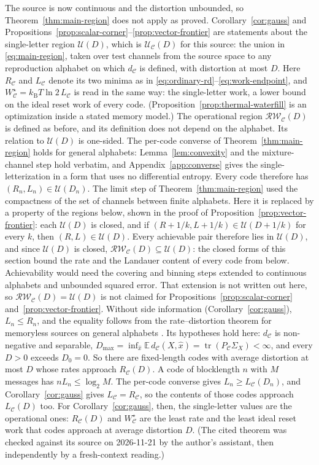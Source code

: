 \documentclass[letterpaper,onecolumn]{IEEEtran}
\theoremstyle{definition}
\theoremstyle{remark}
\newcommand{\E}{\mathbb{E}}
\newcommand{\cC}{\mathcal{C}}
\newcommand{\RW}{\mathcal{R}\!\mathcal{W}}
\newcommand{\PC}{P_{\mathcal{C}}}
\newcommand{\tr}{\operatorname{tr}}
\newcommand{\1}{\mathbf{1}}
\newcommand{\kb}{k_{\mathrm B}}
\begin{document}
The source is now continuous and the distortion unbounded, so
Theorem~\ref{thm:main-region} does not apply as proved.
Corollary~\ref{cor:gauss} and
Propositions~\ref{prop:scalar-corner}--\ref{prop:vector-frontier} are
statements about the single-letter region $\mathcal U(D)$, which is
$\mathcal U_{\cC}(D)$ for this source: the union in \eqref{eq:main-region},
taken over test channels from the source space to any reproduction alphabet on
which $d_{\cC}$ is defined, with distortion at most $D$. Here $R_{\cC}$ and
$L_{\cC}$ denote its two minima as in
\eqref{eq:ordinary-rd}--\eqref{eq:work-endpoint}, and
$W_{\cC}^\star=\kb T\ln2\,L_{\cC}$ is read in the same way: the single-letter
work, a lower bound on the ideal reset work of every code.
(Proposition~\ref{prop:thermal-waterfill} is an optimization inside a stated
memory model.) The operational region $\RW_{\cC}(D)$ is defined as before, and
its definition does not depend on the alphabet. Its relation to
$\mathcal U(D)$ is one-sided. The per-code converse of
Theorem~\ref{thm:main-region} holds for general alphabets:
Lemma~\ref{lem:convexity} and the mixture-channel step hold verbatim, and
Appendix~\ref{app:converse} gives the single-letterization in a form that uses
no differential entropy. Every code therefore has
$(R_n,L_n)\in\mathcal U(D_n)$. The limit step of
Theorem~\ref{thm:main-region} used the compactness of the set of channels
between finite alphabets. Here it is replaced by a property of the regions
below, shown in the proof of Proposition~\ref{prop:vector-frontier}: each
$\mathcal U(D)$ is closed, and if $(R+1/k,L+1/k)\in\mathcal U(D+1/k)$ for every
$k$, then $(R,L)\in\mathcal U(D)$. Every achievable pair therefore lies in
$\mathcal U(D)$, and since $\mathcal U(D)$ is closed,
$\RW_{\cC}(D)\subseteq\mathcal U(D)$: the closed forms of this section bound
the rate and the Landauer content of every code from below. Achievability would need the
covering and binning steps extended to continuous alphabets and unbounded
squared error. That extension is not written out here, so
$\RW_{\cC}(D)=\mathcal U(D)$ is not claimed for
Propositions~\ref{prop:scalar-corner} and~\ref{prop:vector-frontier}. Without
side information (Corollary~\ref{cor:gauss}), $L_n\le R_n$, and the equality
follows from the rate--distortion theorem for memoryless sources on general
alphabets \cite[Thm.~24.2]{polyanskiywu2016}. Its hypotheses hold here:
$d_{\cC}$ is non-negative and separable,
$D_{\max}=\inf_{\hat x}\E\,d_{\cC}(X,\hat x)=\tr(\PC\Sigma_X)<\infty$, and
every $D>0$ exceeds $D_0=0$. So there are fixed-length codes with average
distortion at most $D$ whose rates approach $R_{\cC}(D)$. A code of
blocklength $n$ with $M$ messages has $nL_n\le\log_2M$. The per-code converse
gives $L_n\ge L_{\cC}(D_n)$, and Corollary~\ref{cor:gauss} gives
$L_{\cC}=R_{\cC}$, so the contents of those codes approach $L_{\cC}(D)$ too.
For Corollary~\ref{cor:gauss}, then, the single-letter values are the
operational ones: $R_{\cC}(D)$ and $W_{\cC}^\star$ are the least rate and the
least ideal reset work that codes approach at average distortion $D$. (The
cited theorem was checked against its source on 2026-11-21 by the author's
assistant, then independently by a fresh-context reading.)
\end{document}
